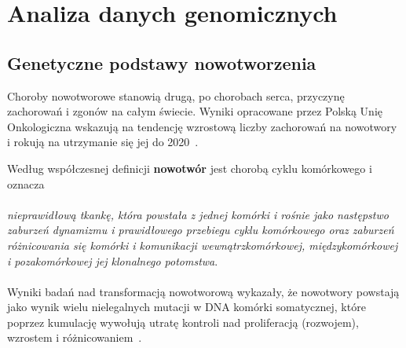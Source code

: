 \chapter{Analiza danych genomicznych}

\newpage
\section{Genetyczne podstawy nowotworzenia}
Choroby nowotworowe stanowią drugą, po chorobach serca, przyczynę zachorowań i zgonów na całym świecie. Wyniki opracowane przez Polską Unię Onkologiczna wskazują na tendencję wzrostową liczby zachorowań na nowotwory i rokują na utrzymanie się jej do 2020~\cite{zikula}.

Według współczesnej definicji \textbf{nowotwór} jest chorobą cyklu komórkowego i oznacza \cite{zikula2} \\ \ \\ \textit{nieprawidłową tkankę, która powstała z jednej komórki i rośnie jako następstwo zaburzeń dynamizmu i prawidłowego przebiegu cyklu komórkowego oraz zaburzeń różnicowania się komórki i komunikacji wewnątrzkomórkowej, międzykomórkowej i pozakomórkowej jej klonalnego potomstwa}. \\ \ \\
Wyniki badań nad transformacją nowotworową wykazały, że nowotwory powstają jako wynik wielu nielegalnych mutacji w DNA komórki somatycznej, które poprzez kumulację wywołują utratę kontroli nad proliferacją (rozwojem), wzrostem i różnicowaniem~\cite{zikula5}.

